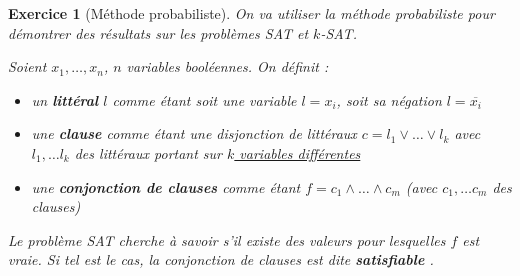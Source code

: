 \documentclass{article}
\theoremstyle{exostyle}
\newtheorem{exo}{Exercice}
\theoremstyle{partiestyle}
\theoremstyle{questionstyle}
\begin{document}
\begin{exo}[Méthode probabiliste]
	On va utiliser la méthode probabiliste pour démontrer des résultats sur les problèmes SAT et $k$-SAT.

		Soient $x_1, \dots, x_n$, $n$ variables booléennes. On définit :

	\begin{itemize} 
		\item un {\bf \em littéral } $l$ comme étant soit une variable $l = x_i$, soit sa négation $l = \overline{x_i}$ 
	\item une {\bf \em clause } comme étant une disjonction de littéraux $c = l_1 \lor \dots
\lor l_k$ avec $l_1, \dots l_k$ des littéraux portant sur \underline{$k$ variables différentes}
\item une {\bf \em conjonction de clauses } comme étant $f = c_1\land \dots \land c_m$ (avec $c_1, \dots c_m$ des clauses) \end{itemize}

 Le problème SAT cherche à savoir s'il existe des valeurs pour lesquelles $f$ est vraie. Si tel est le cas,
la conjonction de clauses est dite {\bf \em satisfiable }.
		

\end{exo}
\end{document}
